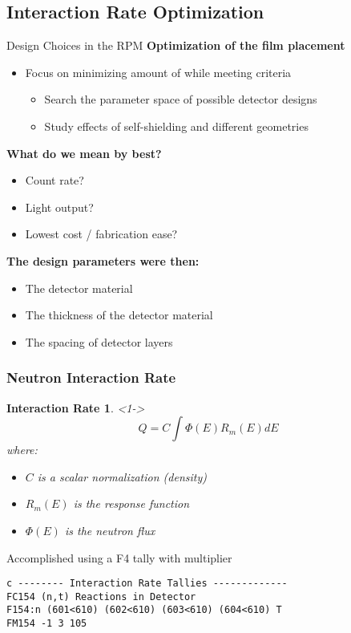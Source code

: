 \subsection{Interaction Rate Optimization}
\begin{frame}{Design Choices in the RPM}
  \large
  \textbf{Optimization of the film placement}
  \normalsize
  \begin{itemize}
    \item Focus on minimizing amount of  while meeting criteria
    \begin{itemize}
      \item Search the parameter space of possible detector designs
      \item Study effects of self-shielding and different geometries
    \end{itemize}
  \end{itemize}
\textbf{What do we mean by best?}
\begin{itemize}
	\small
  \item Count rate? 
  \item Light output?
	\item Lowest cost / fabrication ease?
\end{itemize}
\textbf{The design parameters were then:}
\begin{itemize}
	\small
  \item The detector material
  \item The thickness of the detector material
  \item The spacing of detector layers
\end{itemize}
\end{frame}
\begin{frame}[fragile]
\label{MCNPXMain}
\frametitle{Neutron Interaction Rate}
	\tiny
	\newtheorem{thm11}{Interaction Rate}
	\begin{thm11}<1->
		$$Q = C \int {\Phi(E) R_m(E) dE }$$
	where:
	\begin{itemize}
		\item $C$ is a scalar normalization (density)
		\item $R_m(E)$ is the response function
		\item $\Phi(E)$ is the neutron flux
	\end{itemize}
	\end{thm11}
Accomplished using a F4 tally with multiplier
\tiny
\begin{lstlisting}
c -------- Interaction Rate Tallies -------------
FC154 (n,t) Reactions in Detector
F154:n (601<610) (602<610) (603<610) (604<610) T
FM154 -1 3 105
\end{lstlisting}
\hyperlink{MCNPXMethodExtended}{}
\end{frame}
